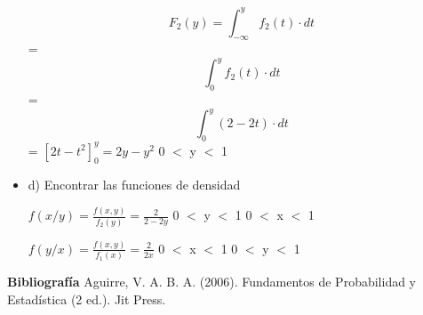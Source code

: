 \documentclass{../oxmathproblems}
\begin{document}
\begin{questions}
\begin{itemize}
\begin{equation}
F_2(y) = \int _{-\infty}^{y} f_2(t)  \cdot dt
\end{equation} 
= 
\begin{equation}
 \int _{0}^{y} f_2(t)  \cdot dt
\end{equation} 
= 
\begin{equation}
 \int _{0}^{y} (2-2t)  \cdot dt
\end{equation} 
= $ [2t - t^2]_0^y = 2y - y^2 $    0 $<$ y $<$ 1 


\item  d) Encontrar las funciones de densidad 

$f(x/y) = \frac{f(x,y)}{f_2(y)} = \frac{2}{2-2y}$   0 $<$ y $<$ 1      0 $<$ x $<$ 1



$f(y/x) = \frac{f(x,y)}{f_1(x)} = \frac{2}{2x} $   0 $<$ x $<$ 1      0 $<$ y $<$ 1
\end{itemize}

\end{questions}



\textbf{Bibliografía}
Aguirre, V. A. B. A. (2006). Fundamentos de Probabilidad y Estadística (2 ed.). Jit Press.
\end{document}
